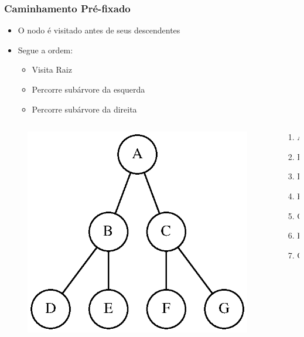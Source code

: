 \documentclass[aspectratio=169]{beamer}
\begin{document}
\begin{frame}\frametitle{Caminhamento Pré-fixado}
\begin{itemize}
	\item O nodo é visitado antes de seus descendentes
	\item Segue a ordem:
	\begin{itemize}
		\item Visita Raiz
		\item Percorre subárvore da esquerda
		\item Percorre subárvore da direita
	\end{itemize}
\end{itemize}
\begin{columns}[T]
\begin{column}{0.7\linewidth}
\begin{figure}[h]
	\centering
	\includegraphics[height=0.4\paperheight]{imagens/arvore_binaria08.eps}
\end{figure}
\end{column}
\begin{column}{0.3\linewidth}
\pause
\begin{enumerate}
	\item A
	\item B
	\item D
	\item E
	\item C
	\item F
	\item G
\end{enumerate}
\end{column}
\end{columns}
\end{frame}
\end{document}
